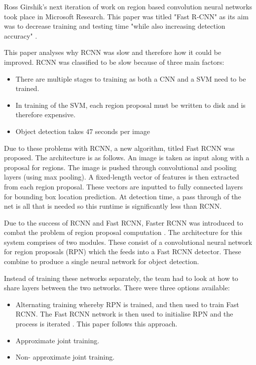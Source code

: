 Ross Girshik's next iteration of work on region based convolution neural
networks took place in Microsoft Research. This paper was titled "Fast R-CNN" as
its aim was to decrease training and testing time "while also increasing
detection accuracy" \parencite{fastRcnn}.

This paper analyses why RCNN \parencite{rcnn} was slow and therefore how it could be improved.
RCNN was classified to be slow because of three main factors:
\begin{itemize}
	\item{There are multiple stages to training as both a CNN and a SVM need to
		be trained.}
	\item{In training of the SVM, each region proposal must be written to disk
		and is therefore expensive.}
	\item{Object detection takes 47 seconds per image}
\end{itemize}

Due to these problems with RCNN, a new algorithm, titled Fast RCNN was proposed.
The architecture is as follows. An image is taken as input along with a
proposal for regions. The image is pushed through convolutional and pooling
layers (using max pooling). A fixed-length vector of features is then extracted
from each region proposal. These vectors are inputted to fully connected
layers for bounding box location prediction.
At detection time, a pass through of the net is all that is needed so this
runtime is significantly less than RCNN.

Due to the success of RCNN and Fast RCNN, Faster RCNN was introduced to combat
the problem of region proposal computation \parencite{fasterRcnn}.
The architecture for this system comprises of two modules. These consist of a
convolutional neural network for region proposals (RPN) which the feeds into a Fast
RCNN detector. These combine to produce a single neural network for object
detection.

Instead of training these networks separately, the team had to look at how to
share layers between the two networks. There were three options available:
\begin{itemize}
    \item{Alternating training whereby RPN is trained, and then used to train
        Fast RCNN. The Fast RCNN network is then used to initialise RPN and the
		process is iterated \parencite{fasterRcnn}. This paper follows this approach.}
    \item{Approximate joint training.}
    \item{Non- approximate joint training.}
\end{itemize}

